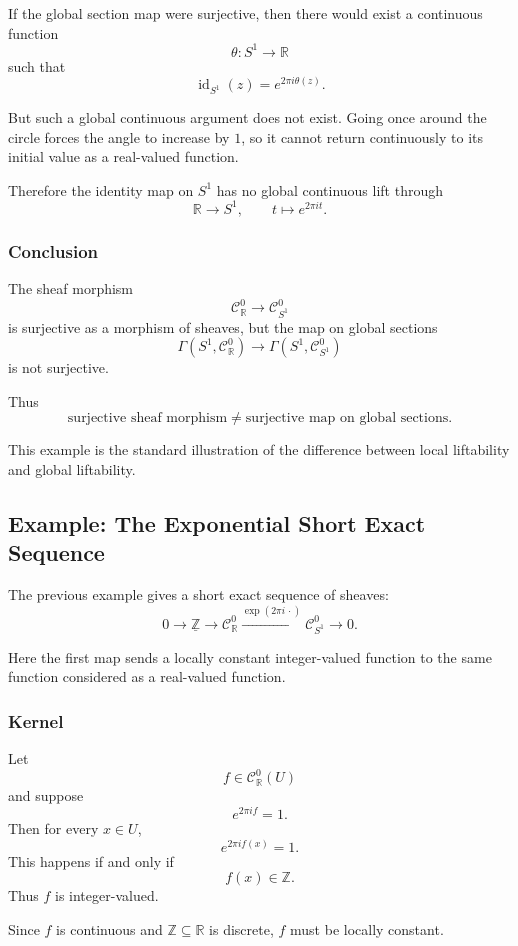 \documentclass[12pt,a4paper]{article}
\DeclareMathOperator{\id}{id}
\newcommand{\RR}{\mathbb{R}}
\newcommand{\ZZ}{\mathbb{Z}}
\newcommand{\Czero}{\mathcal C^0}        %
\theoremstyle{notespace}
\newcommand{\SSone}{S^1}
\begin{document}
If the global section map were surjective, then there would exist a continuous function
\[
\theta:\SSone\to \RR
\]
such that
\[
\id_{\SSone}(z)=e^{2\pi i\theta(z)}.
\]

But such a global continuous argument does not exist. Going once around the circle forces the angle to increase by \(1\), so it cannot return continuously to its initial value as a real-valued function.

Therefore the identity map on \(\SSone\) has no global continuous lift through
\[
\RR\to \SSone,
\qquad
t\mapsto e^{2\pi i t}.
\]

\subsubsection*{Conclusion}

The sheaf morphism
\[
\Czero_{\RR}\to \Czero_{\SSone}
\]
is surjective as a morphism of sheaves, but the map on global sections
\[
\Gamma(\SSone,\Czero_{\RR})
\to
\Gamma(\SSone,\Czero_{\SSone})
\]
is not surjective.

Thus
\[
\boxed{
	\text{surjective sheaf morphism}
	\neq
	\text{surjective map on global sections}.
}
\]

This example is the standard illustration of the difference between local liftability and global liftability.

\subsection{Example: The Exponential Short Exact Sequence}

The previous example gives a short exact sequence of sheaves:
\[
0\to \underline{\ZZ}
\to \Czero_{\RR}
\xrightarrow{\exp(2\pi i\,\cdot)}
\Czero_{\SSone}
\to 0.
\]

Here the first map sends a locally constant integer-valued function to the same function considered as a real-valued function.

\subsubsection*{Kernel}

Let
\[
f\in \Czero_{\RR}(U)
\]
and suppose
\[
e^{2\pi i f}=1.
\]
Then for every \(x\in U\),
\[
e^{2\pi i f(x)}=1.
\]
This happens if and only if
\[
f(x)\in \ZZ.
\]
Thus \(f\) is integer-valued.

Since \(f\) is continuous and \(\ZZ\subseteq \RR\) is discrete, \(f\) must be locally constant.
\end{document}
